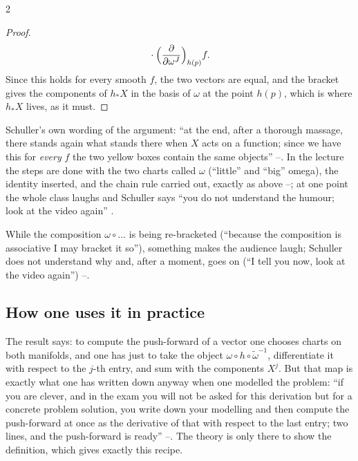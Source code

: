 \begin{paracol}{2}
\begin{proof}
\begin{align*}
  &\quad\cdot\Bigl(\frac{\partial}{\partial\omega^J}\Bigr)_{h(p)}f .
\end{align*}
Since this holds for every smooth $f$, the two vectors are equal, and the bracket gives the components of $h_*X$ in the basis of $\omega$ at the point $h(p)$, which is where $h_*X$ lives, as it must. \qedhere
\end{proof}
Schuller's own wording of the argument: ``at the end, after a thorough massage, there stands again what stands there when $X$ acts on a function; since we have this for \emph{every} $f$ the two yellow boxes contain the same objects'' --. In the lecture the steps are done with the two charts called $\omega$ (``little'' and ``big'' omega), the identity inserted, and the chain rule carried out, exactly as above --; at one point the whole class laughs and Schuller says ``you do not understand the humour; look at the video again'' .

\begin{coursenote}\label{cn:zw-laugh}
While the composition $\omega\circ\dots$ is being re-bracketed (``because the composition is associative I may bracket it so''), something makes the audience laugh; Schuller does not understand why and, after a moment, goes on (``I tell you now, look at the video again'') --.
\end{coursenote}

\subsection{How one uses it in practice}\label{ssec:zw-practice}

The result says: to compute the push-forward of a vector one chooses charts on both manifolds, and one has just to take the object $\omega\circ h\circ\tilde\omega^{-1}$, differentiate it with respect to the $j$-th entry, and sum with the components $X^j$. But that map is exactly what one has written down anyway when one modelled the problem: ``if you are clever, and in the exam you will not be asked for this derivation but for a concrete problem solution, you write down your modelling and then compute the push-forward at once as the derivative of that with respect to the last entry; two lines, and the push-forward is ready'' --. The theory is only there to show the definition, which gives exactly this recipe.


\end{paracol}
